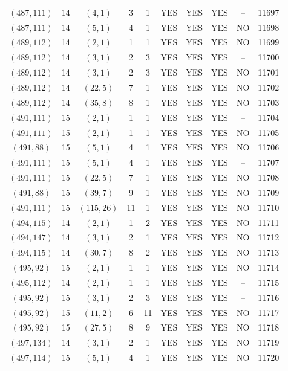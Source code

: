 \begin{longtable}{|c|c|c|c|c|c|c|c|c|c|}
$(487, 111)$ & 14 & $(4, 1)$ & 3 & 1 & YES & YES & YES & -- & 11697\\
$(487, 111)$ & 14 & $(5, 1)$ & 4 & 1 & YES & YES & YES & NO & 11698\\
$(489, 112)$ & 14 & $(2, 1)$ & 1 & 1 & YES & YES & YES & NO & 11699\\
$(489, 112)$ & 14 & $(3, 1)$ & 2 & 3 & YES & YES & YES & -- & 11700\\
$(489, 112)$ & 14 & $(3, 1)$ & 2 & 3 & YES & YES & YES & NO & 11701\\
$(489, 112)$ & 14 & $(22, 5)$ & 7 & 1 & YES & YES & YES & NO & 11702\\
$(489, 112)$ & 14 & $(35, 8)$ & 8 & 1 & YES & YES & YES & NO & 11703\\
$(491, 111)$ & 15 & $(2, 1)$ & 1 & 1 & YES & YES & YES & -- & 11704\\
$(491, 111)$ & 15 & $(2, 1)$ & 1 & 1 & YES & YES & YES & NO & 11705\\
$(491, 88)$ & 15 & $(5, 1)$ & 4 & 1 & YES & YES & YES & NO & 11706\\
$(491, 111)$ & 15 & $(5, 1)$ & 4 & 1 & YES & YES & YES & -- & 11707\\
$(491, 111)$ & 15 & $(22, 5)$ & 7 & 1 & YES & YES & YES & NO & 11708\\
$(491, 88)$ & 15 & $(39, 7)$ & 9 & 1 & YES & YES & YES & NO & 11709\\
$(491, 111)$ & 15 & $(115, 26)$ & 11 & 1 & YES & YES & YES & NO & 11710\\
$(494, 115)$ & 14 & $(2, 1)$ & 1 & 2 & YES & YES & YES & NO & 11711\\
$(494, 147)$ & 14 & $(3, 1)$ & 2 & 1 & YES & YES & YES & NO & 11712\\
$(494, 115)$ & 14 & $(30, 7)$ & 8 & 2 & YES & YES & YES & NO & 11713\\
$(495, 92)$ & 15 & $(2, 1)$ & 1 & 1 & YES & YES & YES & NO & 11714\\
$(495, 112)$ & 14 & $(2, 1)$ & 1 & 1 & YES & YES & YES & -- & 11715\\
$(495, 92)$ & 15 & $(3, 1)$ & 2 & 3 & YES & YES & YES & -- & 11716\\
$(495, 92)$ & 15 & $(11, 2)$ & 6 & 11 & YES & YES & YES & NO & 11717\\
$(495, 92)$ & 15 & $(27, 5)$ & 8 & 9 & YES & YES & YES & NO & 11718\\
$(497, 134)$ & 14 & $(3, 1)$ & 2 & 1 & YES & YES & YES & NO & 11719\\
$(497, 114)$ & 15 & $(5, 1)$ & 4 & 1 & YES & YES & YES & NO & 11720\\

\end{longtable}
